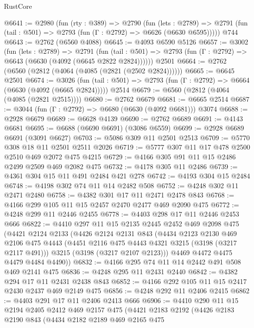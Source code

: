 \begin{lexlean}{RustCore}
\begin{coremodule}
@6641 := @2980
    (fun (rty : @389) =>
    @2790
      (fun (lets : @2789) =>
      @2791 (fun (tail : @501) => @2793 (fun (Γ : @2792) => @6626 (@6630 @6595)))))
    @744
@6643 := @2762 (@6560 @4088)
@6645 := @4093 @6590 @5126
@6657 := @3002
    (fun (lets : @2789) =>
    @2791
      (fun (tail : @501) => @2793 (fun (Γ : @2792) => @6643 (@6630 (@4092 (@6645 @2822 @2824))))))
    @2501
@6664 := @2762 (@6560 (@2812 (@4064 (@4085 (@2821 (@2502 @2824))))))
@6665 := @6645 @2501
@6674 := @3026
    (fun (tail : @501) => @2793 (fun (Γ : @2792) => @6664 (@6630 (@4092 (@6665 @2824)))))
    @2514
@6679 := @6560 (@2812 (@4064 (@4085 (@2821 @2515))))
@6680 := @2762 @6679
@6681 := @6665 @2514
@6687 := @3044 (fun (Γ : @2792) => @6680 (@6630 (@4092 @6681))) @3074
@6688 := @2928 @6679
@6689 := @6628 @4139
@6690 := @2762 @6689
@6691 := @4143 @6681
@6695 := @6688 (@6690 @6691) (@3086 @6559)
@6699 := @2928 @6689 @6691 (@3091 @6627)
@6703 := @5086 @309 @11 @2501 @2513
@6709 := @5770 @308 @18 @11 @2501 @2511 @2026
@6719 := @5777 @307 @11 @17 @478 @2500 @2510 @469 @2072 @475 @4215
@6729 := @4166 @305 @91 @11 @15 @2486 @2499 @2509 @469 @2082 @475
@6732 := @4178 @305 @11 @2486
@6739 := @4361 @304 @15 @11 @491 @2484 @421 @278
@6742 := @4193 @304 @15 @2484
@6748 := @4198 @302 @74 @11 @14 @2482 @508
@6752 := @4248 @302 @11 @2471 @2480
@6758 := @4382 @301 @17 @11 @2471 @2478 @843
@6768 := @4166 @299 @105 @11 @15 @2457 @2470 @2477 @469 @2090 @475
@6772 := @4248 @299 @11 @2446 @2455
@6778 := @4403 @298 @17 @11 @2446 @2453 @666
@6822 := @4410
    @297
    @11
    @15
    @2135
    @2445
    @2452
    @469
    @2098
    @475
    (@4421
      @2124
      @2133
      (@4426
        @2124
        @2131
        @843
        (@4434
          @2123
          @2130
          @469
          @2106
          @475
          @4443
          (@4451 @2116 @475 @4443 @4321 @3215 (@3198 (@3217 @2117 @491)))
          @3215
          (@3198 (@3217 @2107 @2123)))
        @4469
        @4472
        @4475
        @4479
        @4484
        @4490))
@6832 := @4166 @295 @74 @11 @14 @2442 @491 @508 @469 @2141 @475
@6836 := @4248 @295 @11 @2431 @2440
@6842 := @4382 @294 @17 @11 @2431 @2438 @843
@6852 := @4166 @292 @105 @11 @15 @2417 @2430 @2437 @469 @2149 @475
@6856 := @4248 @292 @11 @2406 @2415
@6862 := @4403 @291 @17 @11 @2406 @2413 @666
@6906 := @4410
    @290
    @11
    @15
    @2194
    @2405
    @2412
    @469
    @2157
    @475
    (@4421
      @2183
      @2192
      (@4426
        @2183
        @2190
        @843
        (@4434
          @2182
          @2189
          @469
          @2165
          @475

\end{coremodule}
\end{lexlean}
